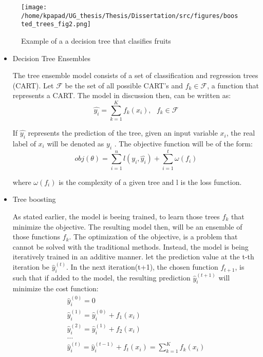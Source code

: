 \begin{figure}[h]
\centering
\texttt{[image: /home/kpapad/UG\_thesis/Thesis/Dissertation/src/figures/boosted\_trees\_fig2.png]}
\caption{Example of a a decision tree that clasifies fruits}
\label{fig:decision_tree}
\end{figure}
\begin{itemize}
\item Decision Tree Ensembles
\label{sec:orga38fe01}

The tree ensemble model consists of a set of classification and regression trees (CART).
Let \(\mathcal{F}\) be the set of all possible CART's and \(f_{k} \in \mathcal{F}\), a function that represents a CART. The model in discussion then, can be written as:
\begin{equation}
\hat{y_{i}} = \sum_{k=1}^{K} f_{k}(x_{i}),\text{ } f_{k} \in \mathcal{F}
\end{equation}

If \(\hat{y_{i}}\) represents the prediction of the tree, given an input variable \(x_{i}\), the real label of \(x_{i}\) will be denoted as \(y_{i}\)  . The objective function will be of the form:
\begin{equation}
obj(\theta) = \sum_{i=1}^{n} l(y_{i}, \hat{y_{i}}) + \sum_{i=1}^{t}\omega(f_{i})
\end{equation}

where \(\omega(f_{i})\) is the complexity of a given tree  and l is the loss function.

\item Tree boosting
\label{sec:org1b1fb81}

As stated earlier, the model is beeing trained, to learn those trees \(f_{k}\) that minimize the objective. The resulting model then, will be an ensemble of those functions \(f_{k}\).
The optimization of the objective, is a problem that cannot be solved with the traditional methods. Instead, the model is being iteratively trained in an additive manner.\cite{Chen_2016}
let the prediction value at the t-th iteration be \(\hat{y}^{(t)}_{i}\). In the next iteration(t+1), the chosen function \(f_{t+1}\), is such that if added to the model, the resulting prediction \(\hat{y}^{(t+1)}_{i}\) will minimize the cost function:
\begin{equation}
\begin{matrix}
\hat{y}^{(0)}_{i} = 0 \\
\hat{y}^{(1)}_{i} =\hat{y}^{(0)}_{i} + f_{1}(x_{i}) \\
\hat{y}^{(2)}_{i} =\hat{y}^{(1)}_{i} + f_{2}(x_{i}) \\
\dots \\
\hat{y}_{i}^{(t)} = \hat{y}_{i}^{(t-1)} + f_{t}(x_{i})= \sum_{k=1}^{K} f_{k}(x_{i}) \\
\end{matrix}
\end{equation}


\end{itemize}
